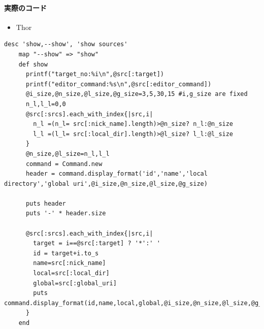 \paragraph{実際のコード}
\begin{itemize}
\item Thor
\end{itemize}\begin{lstlisting}[style=customRuby]
    desc 'show,--show', 'show sources'
    map "--show" => "show"
    def show
      printf("target_no:%i\n",@src[:target])
      printf("editor_command:%s\n",@src[:editor_command])
      @i_size,@n_size,@l_size,@g_size=3,5,30,15 #i,g_size are fixed             
      n_l,l_l=0,0
      @src[:srcs].each_with_index{|src,i|
        n_l =(n_l= src[:nick_name].length)>@n_size? n_l:@n_size
        l_l =(l_l= src[:local_dir].length)>@l_size? l_l:@l_size
      }
      @n_size,@l_size=n_l,l_l
      command = Command.new
      header = command.display_format('id','name','local directory','global uri',@i_size,@n_size,@l_size,@g_size)

      puts header
      puts '-' * header.size

      @src[:srcs].each_with_index{|src,i|
        target = i==@src[:target] ? '*':' '
        id = target+i.to_s
        name=src[:nick_name]
        local=src[:local_dir]
        global=src[:global_uri]
        puts command.display_format(id,name,local,global,@i_size,@n_size,@l_size,@g_size)
      }
    end
\end{lstlisting}
